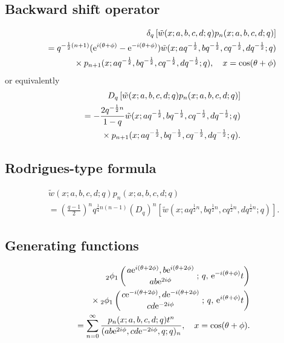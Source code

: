 \documentclass[envcountchap,graybox]{svmono}
\newcommand{\qhyp}[5]{\mbox{}_{#1}{\phi}_{#2}
\left(\genfrac{}{}{0pt}{}{#3}{#4}\,;\,q,\,#5\right)}
\newcommand{\mathindent}{\hspace{7.5mm}}
\newcommand{\e}{\textrm{e}}
\begin{document}
\subsection*{Backward shift operator}
\begin{eqnarray}
\label{shift2ContqHahnI}
& &\delta_q\left[{\tilde w}(x;a,b,c,d;q)p_n(x;a,b,c,d;q)\right]\nonumber\\
& &{}=q^{-\frac{1}{2}(n+1)}(\e^{i(\theta+\phi)}-\e^{-i(\theta+\phi)})
{\tilde w}(x;aq^{-\frac{1}{2}},bq^{-\frac{1}{2}},cq^{-\frac{1}{2}},dq^{-\frac{1}{2}};q)\nonumber\\
& &{}\mathindent{}\times p_{n+1}(x;aq^{-\frac{1}{2}},bq^{-\frac{1}{2}},cq^{-\frac{1}{2}},dq^{-\frac{1}{2}};q),
\quad x=\cos(\theta+\phi)
\end{eqnarray}
or equivalently
\begin{eqnarray}
\label{shift2ContqHahnII}
& &D_q\left[{\tilde w}(x;a,b,c,d;q)p_n(x;a,b,c,d;q)\right]\nonumber\\
& &{}=-\frac{2q^{-\frac{1}{2}n}}{1-q}{\tilde w}(x;aq^{-\frac{1}{2}},bq^{-\frac{1}{2}},cq^{-\frac{1}{2}},dq^{-\frac{1}{2}};q)\nonumber\\
& &{}\mathindent{}\times p_{n+1}(x;aq^{-\frac{1}{2}},bq^{-\frac{1}{2}},cq^{-\frac{1}{2}},dq^{-\frac{1}{2}};q).
\end{eqnarray}

\subsection*{Rodrigues-type formula}
\begin{eqnarray}
\label{RodContqHahn}
& &{\tilde w}(x;a,b,c,d;q)p_n(x;a,b,c,d;q)\nonumber\\
& &{}=\left(\frac{q-1}{2}\right)^nq^{\frac{1}{4}n(n-1)}\left(D_q\right)^n
\left[{\tilde w}(x;aq^{\frac{1}{2}n},bq^{\frac{1}{2}n},cq^{\frac{1}{2}n},dq^{\frac{1}{2}n};q)\right].
\end{eqnarray}

\subsection*{Generating functions}
\begin{eqnarray}
\label{GenContqHahn1}
& &\qhyp{2}{1}{a\e^{i(\theta+2\phi)},b\e^{i(\theta+2\phi)}}{ab\e^{2i\phi}}{\e^{-i(\theta+\phi)}t}\nonumber\\
& &{}\mathindent\times
\qhyp{2}{1}{c\e^{-i(\theta+2\phi)},d\e^{-i(\theta+2\phi)}}{cd\e^{-2i\phi}}{\e^{i(\theta+\phi)}t}\nonumber\\
& &{}=\sum_{n=0}^{\infty}\frac{p_n(x;a,b,c,d;q)t^n}{(ab\e^{2i\phi},cd\e^{-2i\phi},q;q)_n},
\quad x=\cos(\theta+\phi).
\end{eqnarray}
\end{document}
